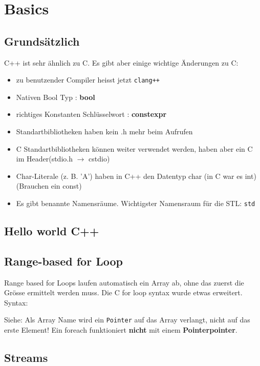 \section{Basics}

\subsection{Grundsätzlich}

C++ ist sehr ähnlich zu C. Es gibt aber einige wichtige Änderungen zu C:

\begin{itemize}[itemsep=1pt, parsep=0pt]
    \item zu benutzender Compiler heisst jetzt \texttt{clang++}
    \item Nativen Bool Typ : \textbf{bool}
    \item richtiges Konstanten Schlüsselwort : \textbf{constexpr}
    \item Standartbibliotheken haben kein .h mehr beim Aufrufen
    \item C Standartbibliotheken können weiter verwendet werden, haben aber ein C im Header(stdio.h $\rightarrow$ cstdio)
    \item Char-Literale (z. B. 'A') haben in C++ den Datentyp char (in C war es int)(Brauchen ein const)
    \item Es gibt benannte Namensräume. Wichtigster Namensraum für die STL: \texttt{std}
\end{itemize}

\subsection{Hello world C++}


\subsection{Range-based for Loop}\label{forEach}

Range based for Loops laufen automatisch ein Array ab, ohne das zuerst die Grösse ermittelt werden muss. 
Die C for loop syntax wurde etwas erweitert.
Syntax:


Siehe: Als Array Name wird ein \texttt{Pointer} auf das Array verlangt, nicht auf das erste Element!  
Ein foreach funktioniert \textbf{nicht} mit einem \textbf{Pointerpointer}. 

\subsection{Streams}

